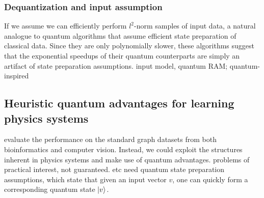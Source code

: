 \subsubsection{Dequantization and input assumption}
If we assume we can efficiently perform $l^2$-norm samples of input data, a natural analogue to quantum algorithms that assume efficient state preparation of classical data.
Since they are only polynomially slower, these algorithms suggest that the exponential speedups of their quantum counterparts are simply an artifact of state preparation assumptions.
\cite{tangQuantuminspiredClassicalAlgorithm2019}
\cite{tangQuantumPrincipalComponent2021}
input model, quantum RAM;
quantum-inspired 

\subsection{Heuristic quantum advantages for learning physics systems}
evaluate the performance on the standard graph datasets from both bioinformatics and computer vision.
Instead, we could exploit the structures inherent in physics systems and make use of quantum advantages.
problems of practical interest,
not guaranteed.
\cite{rebentrostQuantumSupportVector2014} \cite{lloydQuantumPrincipalComponent2014} etc need quantum state preparation assumptions, which state that given an input vector $v$, one can quickly form a corresponding quantum state $\ket{v}$. 

